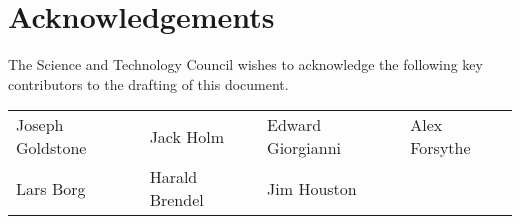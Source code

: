 \cleardoublepage
\unnumberedformat	%
\chapter{Acknowledgements} 	%

The Science and Technology Council wishes to acknowledge the following key contributors to the drafting of this document.

\begin{center}
    \begin{tabular}{llll}
        Joseph Goldstone & Jack Holm & Edward Giorgianni & Alex Forsythe \\
        Lars Borg & Harald Brendel & Jim Houston
    \end{tabular}
\end{center}
    
%
